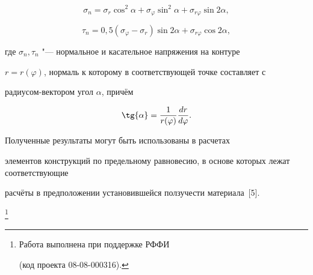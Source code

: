 $$\sigma_{n}=\sigma_{r}\cos^{2}{\alpha}+\sigma_{\varphi}\sin^{2}{\alpha}+

\sigma_{r\varphi}\sin{2\alpha},$$

$$\tau_{n}=0,5(\sigma_{\varphi}-\sigma_{r})

\sin{2\alpha}+\sigma_{r\varphi}\cos{2\alpha},$$

где $\sigma_{n}, \tau_{n}$ "--- нормальное и касательное напряжения на контуре

$r=r(\varphi)$, нормаль к которому в соответствующей точке составляет с

радиусом-вектором угол $\alpha$, причём

$$\tg{\alpha}=\frac{1}{r(\varphi)}\frac{dr}{d\varphi}.$$



 Полученные результаты могут быть использованы в расчетах

элементов конструкций по предельному равновесию, в основе которых лежат соответствующие

расчёты в предположении установившейся ползучести материала~[5].





\thanks{Работа выполнена при поддержке РФФИ

{\rm (}код проекта \rm 08-08-000316{\rm)}.}




\newpage



